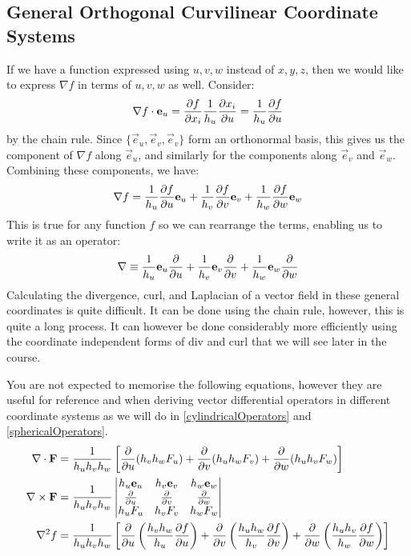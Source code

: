 \documentclass[../main.tex]{subfiles}
\begin{document}
\subsection{General Orthogonal Curvilinear Coordinate Systems}
\label{generalCurvilinearOperators}
If we have a function expressed using $u, v, w$ instead of $x, y, z$, then we would like to express $\nabla f$ in terms of $u, v, w$ as well.
Consider:
\[
  \nabla f \cdot \vec{e}_u = \pderiv{f}{x_i} \frac{1}{h_u} \pderiv{x_i}{u} = \frac{1}{h_u} \pderiv{f}{u}
\]
by the chain rule.
Since $\{\vec{e}_u, \vec{e}_v, \vec{e}_v\}$ form an orthonormal basis, this gives us the component of $\nabla f$ along $\vec{e}_u$, and similarly for the components along $\vec{e}_v$ and $\vec{e}_w$.
Combining these components, we have:
\[
  \nabla f = \frac{1}{h_u} \pderiv{f}{u} \vec{e}_u + \frac{1}{h_v} \pderiv{f}{v} \vec{e}_v + \frac{1}{h_w} \pderiv{f}{w} \vec{e}_w
\]
This is true for any function $f$ so we can rearrange the terms, enabling us to write it as an operator:
\[
  \nabla \equiv \frac{1}{h_u} \vec{e}_u \pderiv{}{u} + \frac{1}{h_v} \vec{e}_v \pderiv{}{v} + \frac{1}{h_w} \vec{e}_w \pderiv{}{w}
\]
Calculating the divergence, curl, and Laplacian of a vector field in these general coordinates is quite difficult.
It can be done using the chain rule, however, this is quite a long process.
It can however be done considerably more efficiently using the coordinate independent forms of div and curl that we will see later in the course.
\begin{remark}[Reference]
  You are not expected to memorise the following equations, however they are useful for reference and when deriving vector differential operators in different coordinate systems as we will do in \cref{cylindricalOperators} and \cref{sphericalOperators}.
  \begin{align*}
    \nabla \cdot \vec{F} &= \frac{1}{h_u h_v h_w} \left[\pderiv{}{u}(h_vh_wF_u) + \pderiv{}{v}(h_uh_wF_v) + \pderiv{}{w}(h_uh_vF_w)\right] \\
    \nabla \times \vec{F} &= \frac{1}{h_u h_v h_w} \begin{vmatrix}
    h_u \vec{e}_u & h_v \vec{e}_v & h_w \vec{e}_w \\
    \pderiv{}{u} & \pderiv{}{v} & \pderiv{}{w} \\
    h_uF_u & h_vF_v & h_wF_w \\
    \end{vmatrix} \\
      \nabla^2 f &= \frac{1}{h_u h_v h_w}\left[\pderiv{}{u}\left(\frac{h_v h_w}{h_u}\pderiv{f}{u}\right)+ \pderiv{}{v}\left(\frac{h_u h_w}{h_v}\pderiv{f}{v}\right) + \pderiv{}{w}\left(\frac{h_u h_v}{h_w} \pderiv{f}{w}\right)\right]
  \end{align*}
\end{remark}
\end{document}
